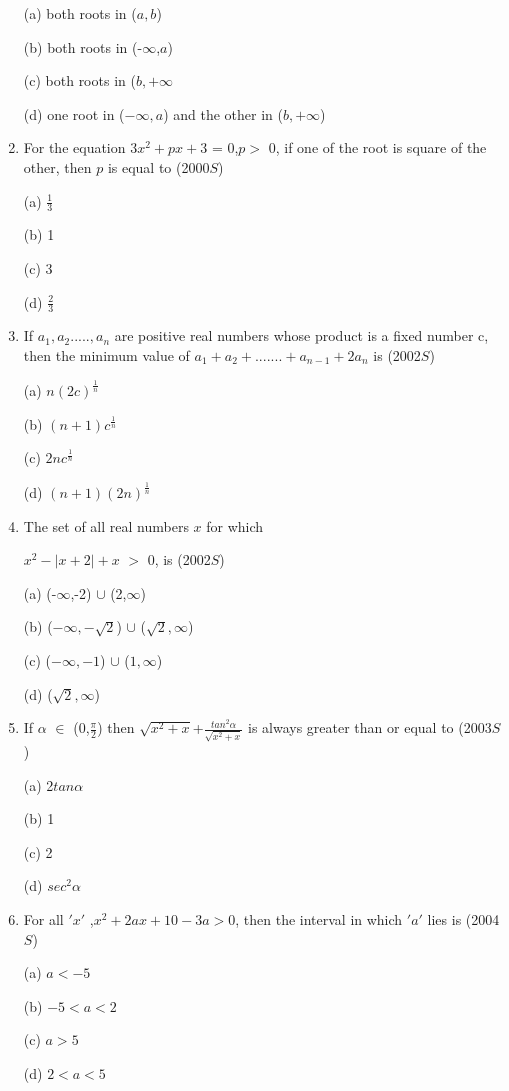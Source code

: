 \documentclass[journal,12pt,twocolumn]{IEEEtran}
\theoremstyle{remark}
\begin{document}
\begin{enumerate}
(a) both roots in ($a,b$)

(b) both roots in (-$\infty$,$a$)

(c) both roots in ($b,+\infty$

(d) one root in ($-\infty,a$) and the other in ($b,+\infty$)

 \item  For the equation $3x^2+px+3$ = 0,$p>$ 0, if one of the root is square of the other, then $p$ is equal to \hfill (2000$S$)

(a) $\frac{1}{3}$

(b) 1

(c) 3

(d) $\frac{2}{3}$

 \item  If $a_1,a_2.....,a_n$ are positive real numbers whose product is a fixed number c, then the minimum value of $a_1+a_2+.......+a_{n-1}+2a_n$ is \hfill (2002$S$)

(a) $n(2c)^{\frac{1}{n}}$

(b) $(n+1)c^\frac{1}{n}$
 
(c) $2nc^\frac{1}{n}$

(d) $(n+1)(2n)^\frac{1}{n}$

 \item The set of all real numbers $x$ for which 

$x^2-|x+2|+x$ $>$ 0, is \hfill (2002$S$)

(a) (-$\infty$,-2) $\cup$ (2,$\infty$)

(b) ($-\infty,-\sqrt{2}$) $\cup$ ($\sqrt{2},\infty$)

(c) ($-\infty,-1$) $\cup$ ($1,\infty$)

(d) ($\sqrt{2},\infty$)

 \item  If $\alpha$ $\in$ (0,$\frac{\pi}{2}$) then $\sqrt{x^2+x}$+$\frac{tan^2\alpha}{\sqrt{x^2+x}}$ is always greater than or equal to \hfill (2003$S$)

(a) 2$tan\alpha$

(b) 1

(c) 2

(d) $sec^2\alpha$

 \item For all $'x'$ ,$x^2+2ax+10-3a >0$, then the interval in which $'a'$ lies is \hfill (2004$S$)

(a) $a < -5$

(b) $-5 < a < 2$

(c) $a > 5$

(d) $2 < a < 5$









\end{enumerate}
\end{document}
